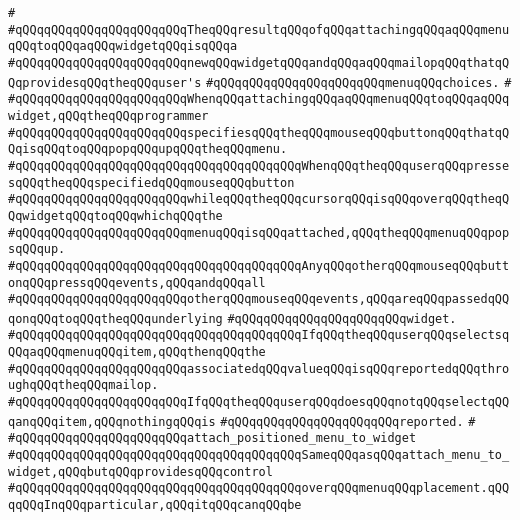 \verb|#|\newline
\verb|#qQQqqQQqqQQqqQQqqQQqqQQqTheqQQqresultqQQqofqQQqattachingqQQqaqQQqmenuqQQqtoqQQqaqQQqwidgetqQQqisqQQqa|\newline
\verb|#qQQqqQQqqQQqqQQqqQQqqQQqnewqQQqwidgetqQQqandqQQqaqQQqmailopqQQqthatqQQqprovidesqQQqtheqQQquser's|\newline
\verb|#qQQqqQQqqQQqqQQqqQQqqQQqmenuqQQqchoices.|\newline
\verb|#|\newline
\verb|#qQQqqQQqqQQqqQQqqQQqqQQqWhenqQQqattachingqQQqaqQQqmenuqQQqtoqQQqaqQQqwidget,qQQqtheqQQqprogrammer|\newline
\verb|#qQQqqQQqqQQqqQQqqQQqqQQqspecifiesqQQqtheqQQqmouseqQQqbuttonqQQqthatqQQqisqQQqtoqQQqpopqQQqupqQQqtheqQQqmenu.|\newline
\verb|#qQQqqQQqqQQqqQQqqQQqqQQqqQQqqQQqqQQqqQQqWhenqQQqtheqQQquserqQQqpressesqQQqtheqQQqspecifiedqQQqmouseqQQqbutton|\newline
\verb|#qQQqqQQqqQQqqQQqqQQqqQQqwhileqQQqtheqQQqcursorqQQqisqQQqoverqQQqtheqQQqwidgetqQQqtoqQQqwhichqQQqthe|\newline
\verb|#qQQqqQQqqQQqqQQqqQQqqQQqmenuqQQqisqQQqattached,qQQqtheqQQqmenuqQQqpopsqQQqup.|\newline
\verb|#qQQqqQQqqQQqqQQqqQQqqQQqqQQqqQQqqQQqqQQqAnyqQQqotherqQQqmouseqQQqbuttonqQQqpressqQQqevents,qQQqandqQQqall|\newline
\verb|#qQQqqQQqqQQqqQQqqQQqqQQqotherqQQqmouseqQQqevents,qQQqareqQQqpassedqQQqonqQQqtoqQQqtheqQQqunderlying|\newline
\verb|#qQQqqQQqqQQqqQQqqQQqqQQqwidget.|\newline
\verb|#qQQqqQQqqQQqqQQqqQQqqQQqqQQqqQQqqQQqqQQqIfqQQqtheqQQquserqQQqselectsqQQqaqQQqmenuqQQqitem,qQQqthenqQQqthe|\newline
\verb|#qQQqqQQqqQQqqQQqqQQqqQQqassociatedqQQqvalueqQQqisqQQqreportedqQQqthroughqQQqtheqQQqmailop.|\newline
\verb|#qQQqqQQqqQQqqQQqqQQqqQQqIfqQQqtheqQQquserqQQqdoesqQQqnotqQQqselectqQQqanqQQqitem,qQQqnothingqQQqis|\newline
\verb|#qQQqqQQqqQQqqQQqqQQqqQQqreported.|\newline
\verb|#|\newline
\verb|#qQQqqQQqqQQqqQQqqQQqqQQqattach_positioned_menu_to_widget|\newline
\verb|#qQQqqQQqqQQqqQQqqQQqqQQqqQQqqQQqqQQqqQQqSameqQQqasqQQqattach_menu_to_widget,qQQqbutqQQqprovidesqQQqcontrol|\newline
\verb|#qQQqqQQqqQQqqQQqqQQqqQQqqQQqqQQqqQQqqQQqoverqQQqmenuqQQqplacement.qQQqqQQqInqQQqparticular,qQQqitqQQqcanqQQqbe|\newline
